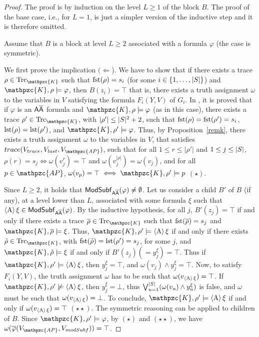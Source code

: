 \begin{proof}
The proof is by induction on the level $L \geq 1$ of the block $B$. The proof of the base case, i.e., for $L=1$, is just a simpler version of the inductive step and it is therefore omitted.

Assume that $B$ is a \forw{} block  at level $L\geq 2$ associated with a formula $\varphi$ (the \back{} case is symmetric).

We first prove the implication $(\Leftarrow$). We have to show that if there exists a trace $\rho\in\Trk_\mathpzc{K}$ such that $\operatorname{fst}(\rho)=s_i$ (for some $i\in\{1,\ldots,|S|\}$) and $\mathpzc{K},\rho\models\varphi$, then $B(z_i)=\top$ that is, there exists a truth assignment $\omega$ to the variables in $V$ satisfying the formula $F_i(Y,V)$ of
$G_i$. In \cite{MMP15}, it is proved that if $\varphi$ is an $\mathsf{A\overline{A}}$ formula and $\mathpzc{K},\rho\models\varphi$ (as in this case), there exists a trace $\rho'\in\Trk_\mathpzc{K}$, with $|\rho'|\leq |S|^2+2$, such that $\operatorname{fst}(\rho)=\operatorname{fst}(\rho')=s_i$, $\operatorname{lst}(\rho)=\operatorname{lst}(\rho')$, and $\mathpzc{K},\rho'\models\varphi$. 
Thus, by Proposition~\ref{remk}, there exists a truth assignment $\omega$ to the variables in $V$, that satisfies $trace(V_{trace},V_{last},V_{\mathpzc{AP}})$, such that for all $1 \leq r \leq |\rho'|$ and $1 \leq j \leq |S|$, $\rho(r)=s_j\iff\omega(v_j^r)=\top$ and $\omega(v_j^{|\rho|})=\omega(v_j)$, and for all $p\in\mathpzc{AP}$, $\omega(v_p)=\top\iff\mathpzc{K},\rho'\models p$ $(\star)$. 

Since $L\geq 2$, it holds that $\mathsf{ModSubf}_{\mathsf{A\overline{A}}}(\varphi)\neq \emptyset$. Let us consider a \forw{} child $B'$ of $B$ (if any), at a level lower than $L$, associated with some formula $\xi$ such that $\operatorname{\langle A\rangle}\xi\in\mathsf{ModSubf}_{\mathsf{A\overline{A}}}(\varphi)$. By the inductive hypothesis, for all $j$, $B'(z_j)=\top$ if and only if there exists a trace $\overline{\rho}\in\Trk_\mathpzc{K}$ such that $\operatorname{fst}(\overline{\rho})=s_j$ and $\mathpzc{K},\overline{\rho}\models\xi$. Thus, $\mathpzc{K},\rho'\models\hsA\xi$ if and only if there exists $\tilde{\rho}\in\Trk_\mathpzc{K}$, with $\operatorname{fst}(\tilde{\rho})=\operatorname{lst}(\rho')=s_j$, for some $j$, and $\mathpzc{K},\tilde{\rho}\models\xi$ if and only if $B'(z_j)(=y_j^\xi)=\top$. Thus if $\mathpzc{K},\rho'\models\hsA\xi$, then $y_j^\xi=\top$, and $\omega(v_j)\wedge y_j^\xi=\top$. Now, to satisfy $F_i(Y,V)$, the truth assignment $\omega$ has to be such that $\omega(v_{\operatorname{\langle A\rangle}\xi})=\top$. If $\mathpzc{K},\rho'\not\models\hsA\xi$, then $y_j^\xi=\bot$, thus $\bigvee_{u=1}^{|S|} (\omega(v_u) \wedge y_u^{\xi})$ is false, and $\omega$ must be such that $\omega(v_{\operatorname{\langle A\rangle}\xi})=\bot$. To conclude, $\mathpzc{K},\rho'\models\hsA\xi$ if and only if $\omega(v_{\operatorname{\langle A\rangle}\xi})=\top$ $(\star\star)$. The symmetric reasoning can be applied to \back{} children of $B$.
%
Since $\mathpzc{K},\rho'\models\varphi$, by $(\star)$ and $(\star\star)$, we have $\omega(\overline{\varphi}(V_{\mathpzc{AP}},V_{modSubf}))=\top$.


\end{proof}
